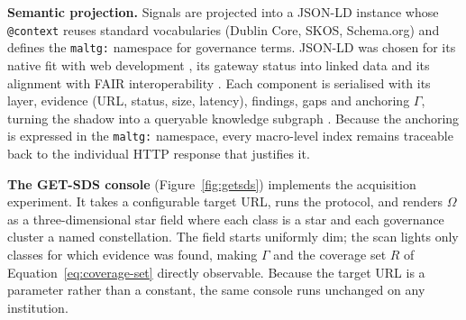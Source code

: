 \documentclass[engproc,proceedingpaper,submit,moreauthors]{Definitions/mdpi}
\begin{document}
    \textbf{Semantic projection.}
    Signals are projected into a JSON-LD instance whose \texttt{@context} reuses standard vocabularies (Dublin Core, SKOS, Schema.org) and defines the \texttt{maltg:} namespace for governance terms. JSON-LD was chosen for its native fit with web development \cite{Guha2016}, its gateway status into linked data \cite{Bizer2009} and its alignment with FAIR interoperability \cite{Wilkinson2016}. Each component is serialised with its layer, evidence (URL, status, size, latency), findings, gaps and anchoring $\Gamma$, turning the shadow into a queryable knowledge subgraph \cite{Hogan2021}. Because the anchoring is expressed in the \texttt{maltg:} namespace, every macro-level index remains traceable back to the individual HTTP response that justifies it.

    \textbf{The GET-SDS console} (Figure~\ref{fig:getsds}) implements the acquisition experiment. It takes a configurable target URL, runs the protocol, and renders $\Omega$ as a three-dimensional star field where each class is a star and each governance cluster a named constellation. The field starts uniformly dim; the scan lights only classes for which evidence was found, making $\Gamma$ and the coverage set $R$ of Equation~\eqref{eq:coverage-set} directly observable. Because the target URL is a parameter rather than a constant, the same console runs unchanged on any institution.
\end{document}
